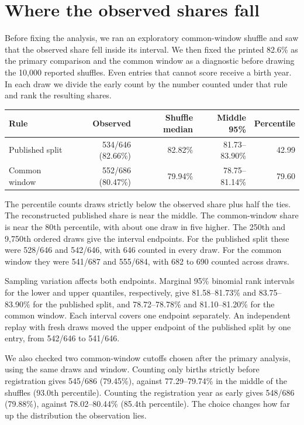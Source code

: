 \documentclass[11pt]{article}
\begin{document}
\section{Where the observed shares fall}
Before fixing the analysis, we ran an exploratory common-window shuffle and saw that the observed share fell inside its interval. We then fixed the printed 82.6\% as the primary comparison and the common window as a diagnostic before drawing the 10,000 reported shuffles. Even entries that cannot score receive a birth year. In each draw we divide the early count by the number counted under that rule and rank the resulting shares.

\begin{center}
\begin{tabular}{lrrrr}
\toprule
Rule & Observed & Shuffle median & Middle 95\% & Percentile\\
\midrule
Published split & 534/646 (82.66\%) & 82.82\% & 81.73--83.90\% & 42.99\\
Common window & 552/686 (80.47\%) & 79.94\% & 78.75--81.14\% & 79.60\\
\bottomrule
\end{tabular}
\end{center}

The percentile counts draws strictly below the observed share plus half the ties. The reconstructed published share is near the middle. The common-window share is near the 80th percentile, with about one draw in five higher. The 250th and 9,750th ordered draws give the interval endpoints. For the published split these were 528/646 and 542/646, with 646 counted in every draw. For the common window they were 541/687 and 555/684, with 682 to 690 counted across draws.

Sampling variation affects both endpoints. Marginal 95\% binomial rank intervals for the lower and upper quantiles, respectively, give 81.58--81.73\% and 83.75--83.90\% for the published split, and 78.72--78.78\% and 81.10--81.20\% for the common window. Each interval covers one endpoint separately. An independent replay with fresh draws moved the upper endpoint of the published split by one entry, from 542/646 to 541/646.

We also checked two common-window cutoffs chosen after the primary analysis, using the same draws and window. Counting only births strictly before registration gives 545/686 (79.45\%), against 77.29--79.74\% in the middle of the shuffles (93.0th percentile). Counting the registration year as early gives 548/686 (79.88\%), against 78.02--80.44\% (85.4th percentile). The choice changes how far up the distribution the observation lies.
\end{document}
